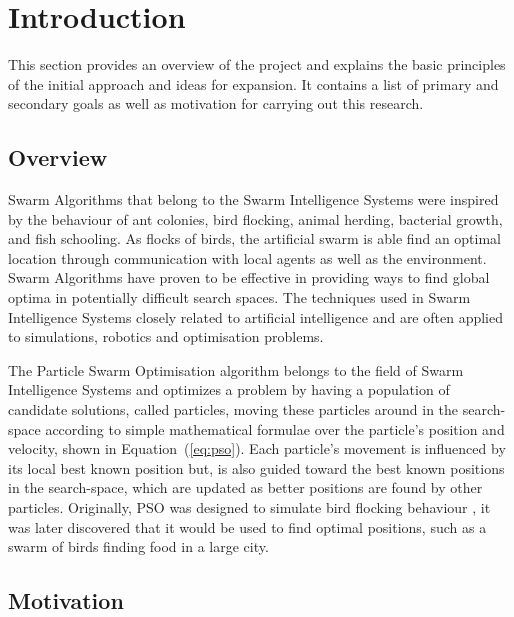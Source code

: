 \chapter{Introduction\label{chap:intro}}
This section provides an overview of the project and explains the basic principles of the initial approach and ideas for expansion. It contains a list of primary and secondary goals as well as motivation for carrying out this research.

  \section{Overview} %
  \label{sec:overview}
  Swarm Algorithms that belong to the Swarm Intelligence Systems were inspired by the behaviour of ant colonies, bird flocking, animal herding, bacterial growth, and fish schooling. As flocks of birds, the artificial swarm is able find an optimal location through communication with local agents as well as the environment. Swarm Algorithms have proven to be effective in providing ways to find global optima in potentially difficult search spaces. The techniques used in Swarm Intelligence Systems closely related to artificial intelligence and are often applied to simulations, robotics and optimisation problems. 

  The Particle Swarm Optimisation algorithm belongs to the field of Swarm Intelligence Systems and optimizes a problem by having a population of candidate solutions, called particles, moving these particles around in the search-space according to simple mathematical formulae over the particle's position and velocity, shown in Equation~(\ref{eq:pso}). Each particle's movement is influenced by its local best known position but, is also guided toward the best known positions in the search-space, which are updated as better positions are found by other particles. Originally, PSO was designed to simulate bird flocking behaviour \cite{pso}, it was later discovered that it would be used to find optimal positions, such as a swarm of birds finding food in a large city.

  \section{Motivation} %
  \label{sec:motivation}

